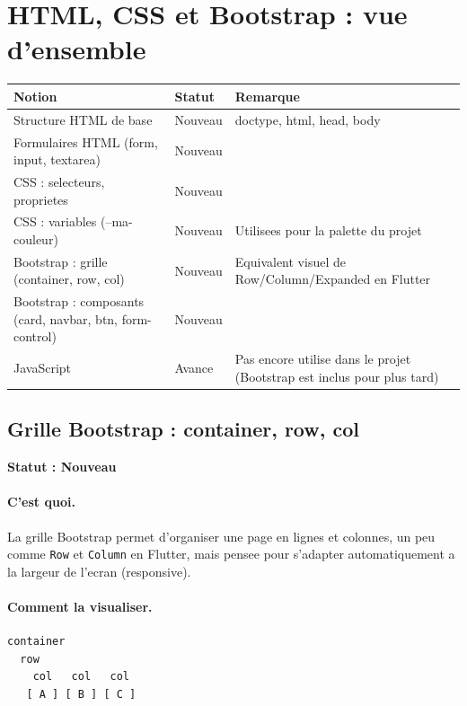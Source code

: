 \documentclass[11pt,a4paper]{article}
\newcommand{\statut}[1]{\textbf{Statut : #1}}
\begin{document}
\section{HTML, CSS et Bootstrap : vue d'ensemble}

\begin{longtable}{|p{5cm}|p{4cm}|p{5cm}|}
\hline
\textbf{Notion} & \textbf{Statut} & \textbf{Remarque} \\
\hline
Structure HTML de base & Nouveau & doctype, html, head, body \\
\hline
Formulaires HTML (form, input, textarea) & Nouveau & \\
\hline
CSS : selecteurs, proprietes & Nouveau & \\
\hline
CSS : variables (--ma-couleur) & Nouveau & Utilisees pour la palette du projet \\
\hline
Bootstrap : grille (container, row, col) & Nouveau & Equivalent visuel de Row/Column/Expanded en Flutter \\
\hline
Bootstrap : composants (card, navbar, btn, form-control) & Nouveau & \\
\hline
JavaScript & Avance & Pas encore utilise dans le projet (Bootstrap est inclus pour plus tard) \\
\hline
\end{longtable}

\subsection{Grille Bootstrap : container, row, col}

\statut{Nouveau}

\paragraph{C'est quoi.}
La grille Bootstrap permet d'organiser une page en lignes et colonnes, un
peu comme \verb|Row| et \verb|Column| en Flutter, mais pensee pour
s'adapter automatiquement a la largeur de l'ecran (responsive).

\paragraph{Comment la visualiser.}

\begin{lstlisting}
container
  row
    col   col   col
   [ A ] [ B ] [ C ]
\end{lstlisting}
\end{document}
